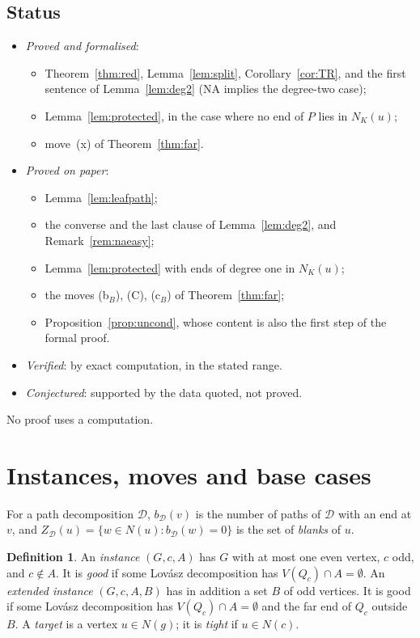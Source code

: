\documentclass[11pt]{amsart}
\theoremstyle{definition}
\newtheorem{definition}[theorem]{Definition}
\newcommand{\cD}{\mathcal D}
\begin{document}
\subsection*{Status}
\begin{itemize}
\item \emph{Proved and formalised}:
  \begin{itemize}
  \item Theorem~\ref{thm:red}, Lemma~\ref{lem:split}, Corollary~\ref{cor:TR}, and the first
  sentence of Lemma~\ref{lem:deg2} (NA implies the degree-two case);
  \item Lemma~\ref{lem:protected}, in the case where no end of $P$ lies in $N_K(u)$;
  \item move~(x) of Theorem~\ref{thm:far}.
  \end{itemize}
\item \emph{Proved on paper}:
  \begin{itemize}
  \item Lemma~\ref{lem:leafpath};
  \item the converse and the last clause of Lemma~\ref{lem:deg2}, and Remark~\ref{rem:naeasy};
  \item Lemma~\ref{lem:protected} with ends of degree one in $N_K(u)$;
  \item the moves (b$_B$), (C), (c$_B$) of Theorem~\ref{thm:far};
  \item Proposition~\ref{prop:uncond}, whose content is also the first step of the formal proof.
  \end{itemize}
\item \emph{Verified}: by exact computation, in the stated range.
\item \emph{Conjectured}: supported by the data quoted, not proved.
\end{itemize}
No proof uses a computation.

\section{Instances, moves and base cases}\label{sec:prelim}

For a path decomposition $\cD$, $b_\cD(v)$ is the number of paths of $\cD$ with an end at $v$, and
$Z_\cD(u)=\{w\in N(u):b_\cD(w)=0\}$ is the set of \emph{blanks} of $u$.

\begin{definition}
An \emph{instance} $(G,c,A)$ has $G$ with at most one even vertex, $c$ odd, and $c\notin A$. It is
\emph{good} if some Lov\'asz decomposition has $V(Q_c)\cap A=\emptyset$. An \emph{extended
instance} $(G,c,A,B)$ has in addition a set $B$ of odd vertices. It is good if some Lov\'asz
decomposition has $V(Q_c)\cap A=\emptyset$ and the far end of $Q_c$ outside $B$. A \emph{target}
is a vertex $u\in N(g)$; it is \emph{tight} if $u\in N(c)$.
\end{definition}
\end{document}
